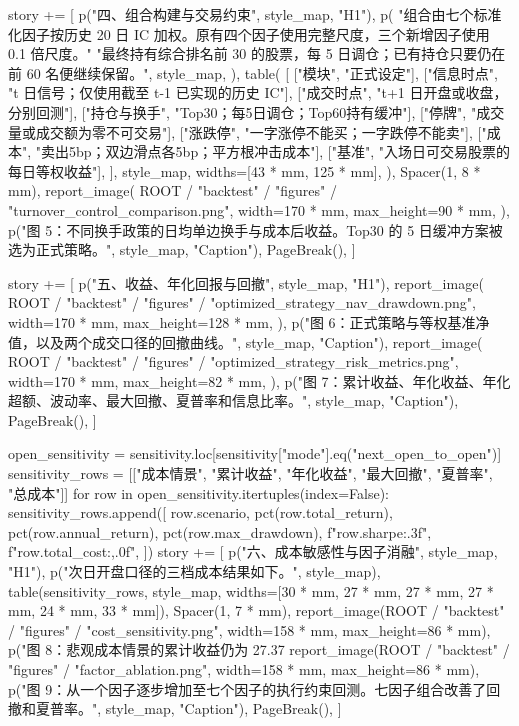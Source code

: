 \documentclass[UTF8,a4paper,fontset=fandol]{ctexart}
\begin{document}
\begin{ProjectCode}
    story += [
        p("四、组合构建与交易约束", style_map, "H1"),
        p(
            "组合由七个标准化因子按历史 20 日 IC 加权。原有四个因子使用完整尺度，三个新增因子使用 0.1 倍尺度。"
            "最终持有综合排名前 30 的股票，每 5 日调仓；已有持仓只要仍在前 60 名便继续保留。",
            style_map,
        ),
        table(
            [
                ["模块", "正式设定"],
                ["信息时点", "t 日信号；仅使用截至 t-1 已实现的历史 IC"],
                ["成交时点", "t+1 日开盘或收盘，分别回测"],
                ["持仓与换手", "Top30；每5日调仓；Top60持有缓冲"],
                ["停牌", "成交量或成交额为零不可交易"],
                ["涨跌停", "一字涨停不能买；一字跌停不能卖"],
                ["成本", "卖出5bp；双边滑点各5bp；平方根冲击成本"],
                ["基准", "入场日可交易股票的每日等权收益"],
            ],
            style_map,
            widths=[43 * mm, 125 * mm],
        ),
        Spacer(1, 8 * mm),
        report_image(
            ROOT / "backtest" / "figures" / "turnover_control_comparison.png",
            width=170 * mm,
            max_height=90 * mm,
        ),
        p("图 5：不同换手政策的日均单边换手与成本后收益。Top30 的 5 日缓冲方案被选为正式策略。", style_map, "Caption"),
        PageBreak(),
    ]

    story += [
        p("五、收益、年化回报与回撤", style_map, "H1"),
        report_image(
            ROOT / "backtest" / "figures" / "optimized_strategy_nav_drawdown.png",
            width=170 * mm,
            max_height=128 * mm,
        ),
        p("图 6：正式策略与等权基准净值，以及两个成交口径的回撤曲线。", style_map, "Caption"),
        report_image(
            ROOT / "backtest" / "figures" / "optimized_strategy_risk_metrics.png",
            width=170 * mm,
            max_height=82 * mm,
        ),
        p("图 7：累计收益、年化收益、年化超额、波动率、最大回撤、夏普率和信息比率。", style_map, "Caption"),
        PageBreak(),
    ]

    open_sensitivity = sensitivity.loc[sensitivity["mode"].eq("next_open_to_open")]
    sensitivity_rows = [["成本情景", "累计收益", "年化收益", "最大回撤", "夏普率", "总成本"]]
    for row in open_sensitivity.itertuples(index=False):
        sensitivity_rows.append([
            row.scenario,
            pct(row.total_return),
            pct(row.annual_return),
            pct(row.max_drawdown),
            f"{row.sharpe:.3f}",
            f"{row.total_cost:,.0f}",
        ])
    story += [
        p("六、成本敏感性与因子消融", style_map, "H1"),
        p("次日开盘口径的三档成本结果如下。", style_map),
        table(sensitivity_rows, style_map, widths=[30 * mm, 27 * mm, 27 * mm, 27 * mm, 24 * mm, 33 * mm]),
        Spacer(1, 7 * mm),
        report_image(ROOT / "backtest" / "figures" / "cost_sensitivity.png", width=158 * mm, max_height=86 * mm),
        p("图 8：悲观成本情景的累计收益仍为 27.37%
        report_image(ROOT / "backtest" / "figures" / "factor_ablation.png", width=158 * mm, max_height=86 * mm),
        p("图 9：从一个因子逐步增加至七个因子的执行约束回测。七因子组合改善了回撤和夏普率。", style_map, "Caption"),
        PageBreak(),
    ]


\end{ProjectCode}
\end{document}
